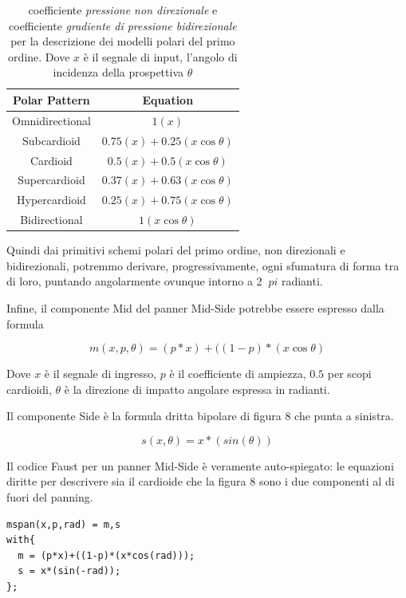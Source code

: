 \begin{table}[h]
\begin{center}
\begin{tabular}{cc}
Polar Pattern & Equation \\
\hline
Omnidirectional & $ 1(x) $ \\
Subcardioid     & $ 0.75(x) + 0.25(x\cos\theta) $ \\
Cardioid        & $ 0.5(x) + 0.5(x\cos\theta) $ \\
Supercardioid   & $ 0.37(x) + 0.63(x\cos\theta) $ \\
Hypercardioid   & $ 0.25(x) + 0.75(x\cos\theta) $ \\
Bidirectional   & $ 1(x\cos\theta) $ \\
\end{tabular}
\end{center}
\caption{coefficiente \emph{pressione non direzionale} e coefficiente
\emph{gradiente di pressione bidirezionale} per la descrizione dei modelli
polari del primo ordine. Dove $ x $ è il segnale di input, l'angolo di incidenza
della prospettiva $\theta$}
\label{tab:example}
\end{table}

Quindi dai primitivi schemi polari del primo ordine, non direzionali e
bidirezionali, potremmo derivare, progressivamente, ogni sfumatura di forma tra
di loro, puntando angolarmente ovunque intorno a 2 $ \ pi $ radianti.

Infine, il componente Mid del panner Mid-Side potrebbe essere espresso dalla
formula

\begin{equation}
m(x,p,\theta) = (p*x) + ((1-p)*(x\cos\theta)
\label{eq:mid}
\end{equation}

Dove $ x $ è il segnale di ingresso, $ p $ è il coefficiente di ampiezza, $0.5$
per scopi cardioidi, $\theta$ è la direzione di impatto angolare espressa in
radianti.

Il componente Side è la formula dritta bipolare di figura 8 che punta a sinistra.

\begin{equation}
s(x,\theta) = x*(sin(\theta))
\label{eq:mid}
\end{equation}

Il codice Faust per un panner Mid-Side è veramente auto-spiegato: le equazioni
diritte per descrivere sia il cardioide che la figura 8 sono i due componenti
al di fuori del panning.

\begin{lstlisting}
mspan(x,p,rad) = m,s
with{
  m = (p*x)+((1-p)*(x*cos(rad)));
  s = x*(sin(-rad));
};
\end{lstlisting}



